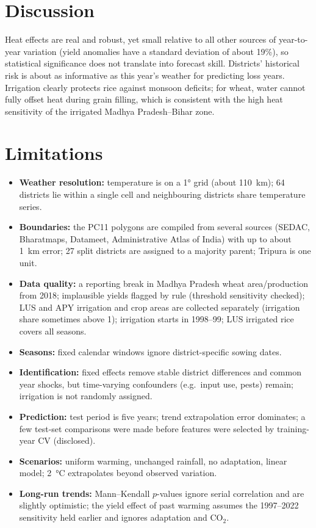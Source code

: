 \documentclass[conference]{IEEEtran}
\begin{document}
\section{Discussion}
Heat effects are real and robust, yet small relative to all other sources of year-to-year variation (yield anomalies
have a standard deviation of about 19\%), so statistical significance does not translate into forecast skill.
Districts' historical risk is about as informative as this year's weather for predicting loss years. Irrigation
clearly protects rice against monsoon deficits; for wheat, water cannot fully offset heat during grain filling, which
is consistent with the high heat sensitivity of the irrigated Madhya Pradesh--Bihar zone.

\section{Limitations}
\begin{itemize}
\item \textbf{Weather resolution:} temperature is on a \ang{1} grid (about \SI{110}{km}); 64 districts lie within a single cell and neighbouring districts share temperature series.
\item \textbf{Boundaries:} the PC11 polygons are compiled from several sources (SEDAC, Bharatmaps, Datameet, Administrative Atlas of India) with up to about \SI{1}{km} error; 27 split districts are assigned to a majority parent; Tripura is one unit.
\item \textbf{Data quality:} a reporting break in Madhya Pradesh wheat area/production from 2018; implausible yields flagged by rule (threshold sensitivity checked); LUS and APY irrigation and crop areas are collected separately (irrigation share sometimes above 1); irrigation starts in 1998--99; LUS irrigated rice covers all seasons.
\item \textbf{Seasons:} fixed calendar windows ignore district-specific sowing dates.
\item \textbf{Identification:} fixed effects remove stable district differences and common year shocks, but time-varying confounders (e.g.\ input use, pests) remain; irrigation is not randomly assigned.
\item \textbf{Prediction:} test period is five years; trend extrapolation error dominates; a few test-set comparisons were made before features were selected by training-year CV (disclosed).
\item \textbf{Scenarios:} uniform warming, unchanged rainfall, no adaptation, linear model; \SI{+2}{\degreeCelsius} extrapolates beyond observed variation.
\item \textbf{Long-run trends:} Mann--Kendall $p$-values ignore serial correlation and are slightly optimistic; the yield effect of past warming assumes the 1997--2022 sensitivity held earlier and ignores adaptation and CO$_2$.
\end{itemize}
\end{document}
